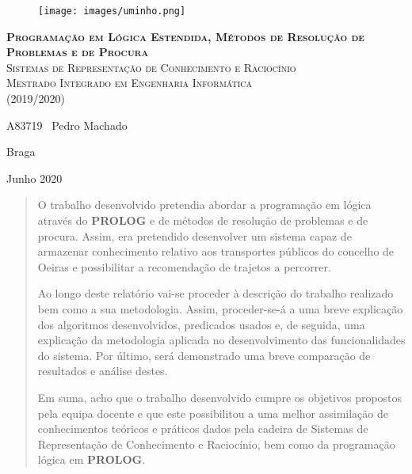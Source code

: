\documentclass[a4paper,12pt]{report}
\begin{document}


\begin{titlepage}
    \center
    {

    \begin{figure}[t]
        \centering
        \texttt{[image: images/uminho.png]}
        \label{img:logo}
        \vspace{2.0cm}
    \end{figure}

    \vspace{3.0cm}
    \textsc{\Huge \textbf{Programação em Lógica Estendida, Métodos de Resolução de Problemas e de Procura}}\\[1.5cm]
    \textsc{\Large Sistemas de Representação de Conhecimento e Raciocínio}\\[1.5cm]
    \textsc{Mestrado Integrado em Engenharia Informática}\\[0.2cm]
    \textsc{(2019/2020)}
    
    \vspace{5cm}
    \begin{flushleft}

        \vspace{1cm}
        \large 
        \vspace{0.5cm}
        A83719 \,\,\,Pedro Machado
        \vspace{0.2cm}
    \end{flushleft}
    \begin{flushright}
        Braga

        Junho 2020
    \end{flushright}

\date{\today}
}
\end{titlepage}


\begin{abstract}
    O trabalho desenvolvido pretendia abordar a programação em lógica através do \textbf{PROLOG} e de métodos de resolução de problemas e de procura. Assim, era pretendido desenvolver um sistema capaz de armazenar conhecimento relativo aos transportes públicos do concelho de Oeiras e possibilitar a recomendação de trajetos a percorrer.
    \par Ao longo deste relatório vai-se proceder à descrição do trabalho realizado bem como a  sua metodologia. Assim, proceder-se-á a uma breve explicação dos algoritmos desenvolvidos, predicados usados e, de seguida, uma explicação da metodologia aplicada no desenvolvimento das funcionalidades do sistema. Por último, será demonstrado uma breve comparação de resultados e análise destes.
    \par Em suma, acho que o trabalho desenvolvido cumpre os objetivos propostos pela equipa docente e que este possibilitou a uma melhor assimilação de conhecimentos teóricos e práticos dados pela cadeira de Sistemas de Representação de Conhecimento e Raciocínio, bem como da programação lógica em \textbf{PROLOG}. 
\end{abstract}
\end{document}
